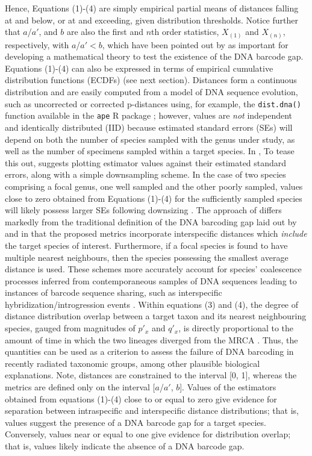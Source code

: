 \documentclass[12pt]{article}
\begin{document}
\noindent Hence, Equations (1)-(4) are simply empirical partial means of distances falling at and below, or at and exceeding, given distribution thresholds. Notice further that $a$/$a'$, and $b$ are also the first and $n$th order statistics, $X_{(1)}$ and $X_{(n)}$, respectively, with  $a$/$a' < b$,  which have been pointed out by \citet{phillips2022lack} as important for developing a mathematical theory to test the existence of the DNA barcode gap. Equations (1)-(4) can also be expressed in terms of empirical cumulative distribution functions (ECDFs) (see next section). Distances form a continuous distribution and are easily computed from a model of DNA sequence evolution, such as uncorrected or corrected p-distances \citep{jukes1969evolution, kimura1980simple} using, for example, the {\tt dist.dna()} function available in the {\tt ape} R package \citep{paradis2004ape}; however, values are \textit{not} independent and identically distributed (IID) because estimated standard errors (SEs) will depend on both the number of species sampled with the genus under study, as well as the number of specimens sampled within a target species. In \citet{phillips2024measure}, To tease this out, \citet{phillips2024measure} suggests plotting estimator values against their estimated standard errors, along with a simple downsampling scheme.  In the case of two species comprising a focal genus, one well sampled and the other poorly sampled, values close to zero obtained from Equations (1)-(4) for the sufficiently sampled species will likely possess larger SEs following downsizing \citep{phillips2024measure}. The approach of \citet{phillips2024measure} differs markedly from the traditional definition of the DNA barcoding gap laid out by \citet{meyer2005dna} and \citet{meier2008use} in that the proposed metrics incorporate interspecific distances which \textit{include} the target species of interest. Furthermore, if a focal species is found to have multiple nearest neighbours, then the species possessing the smallest average distance is used. These schemes more accurately account for species' coalescence processes inferred from contemporaneous samples of DNA sequences leading to instances of barcode sequence sharing, such as interspecific hybridization/introgression events \citep{phillips2024measure}. Within equations (3) and (4), the degree of distance distribution overlap between a target taxon and its nearest neighbouring species, gauged from magnitudes of $p'_x$ and $q'_x$, is directly proportional to the amount of time in which the two lineages diverged from the MRCA \citep{phillips2024measure}. Thus, the quantities can be used as a criterion to assess the failure of DNA barcoding in recently radiated taxonomic groups, among other plausible biological explanations.  Note, distances are constrained to the interval [0, 1], whereas the metrics are defined only on the interval [$a$/$a'$, $b$]. Values of the estimators obtained from equations (1)-(4) close to or equal to zero give evidence for separation between intraspecific and interspecific distance distributions; that is, values suggest the presence of a DNA barcode gap for a target species. Conversely, values near or equal to one give evidence for distribution overlap; that is, values likely indicate the absence of a DNA barcode gap. 
\end{document}
